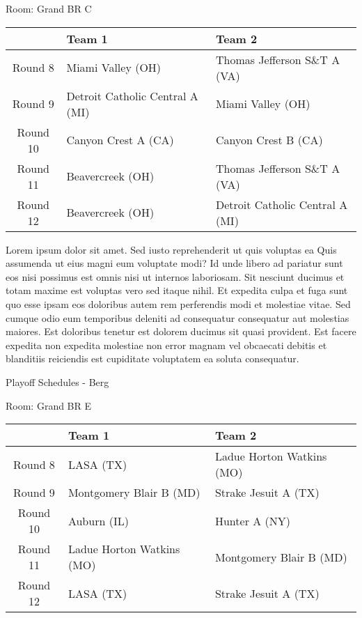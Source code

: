 \documentclass{article}%
\begin{document}
\vspace*{8pt}%
\linebreak%
\begin{flushleft}%
\begin{Large}%
Room: Grand BR C%
\end{Large}%
\end{flushleft}%
\begin{tabularx}{\textwidth}{|c|Y|Y|}%
\hline%
&Team 1&Team 2\\%
\hline%
Round 8&Miami Valley (OH)&Thomas Jefferson S\&T A (VA)\\%
Round 9&Detroit Catholic Central A (MI)&Miami Valley (OH)\\%
Round 10&Canyon Crest A (CA)&Canyon Crest B (CA)\\%
Round 11&Beavercreek (OH)&Thomas Jefferson S\&T A (VA)\\%
Round 12&Beavercreek (OH)&Detroit Catholic Central A (MI)\\%
\hline%
\end{tabularx}%
\vspace*{8pt}%
\linebreak%
\newline%
Lorem ipsum dolor sit amet. Sed iusto reprehenderit ut quis voluptas ea Quis assumenda ut eius magni eum voluptate modi? Id unde libero ad pariatur sunt eos nisi possimus est omnis nisi ut internos laboriosam. Sit nesciunt ducimus et totam maxime est voluptas vero sed itaque nihil. Et expedita culpa et fuga sunt quo esse ipsam eos doloribus autem rem perferendis modi et molestiae vitae.\newline%
\newline%
Sed cumque odio eum temporibus deleniti ad consequatur consequatur aut molestias maiores. Est doloribus tenetur est dolorem ducimus sit quasi provident. Est facere expedita non expedita molestiae non error magnam vel obcaecati debitis et blanditiis reiciendis est cupiditate voluptatem ea soluta consequatur.%
\newpage%
\begin{center}%
\begin{Huge}%
Playoff Schedules {-} Berg%
\end{Huge}%
\end{center}%
\begin{flushleft}%
\begin{Large}%
Room: Grand BR E%
\end{Large}%
\end{flushleft}%
\begin{tabularx}{\textwidth}{|c|Y|Y|}%
\hline%
&Team 1&Team 2\\%
\hline%
Round 8&LASA (TX)&Ladue Horton Watkins (MO)\\%
Round 9&Montgomery Blair B (MD)&Strake Jesuit A (TX)\\%
Round 10&Auburn (IL)&Hunter A (NY)\\%
Round 11&Ladue Horton Watkins (MO)&Montgomery Blair B (MD)\\%
Round 12&LASA (TX)&Strake Jesuit A (TX)\\%
\hline%
\end{tabularx}%
\end{document}
